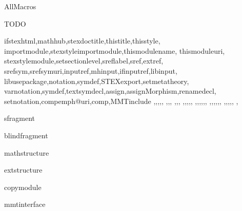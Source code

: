 \documentclass{stex}
\begin{document}
  \begin{smodule}{AllMacros}

  \begin{sfragment}{TODO}

    \begin{sfunction}{
      ifstexhtml,mathhub,stexdoctitle,thistitle,thisstyle,
      importmodule,stexstyleimportmodule,thismodulename,
      thismoduleuri,
      stexstylemodule,setsectionlevel,sreflabel,sref,extref,
      srefsym,srefsymuri,inputref,mhinput,ifinputref,libinput,
      libusepackage,notation,symdef,STEXexport,setmetatheory,
      varnotation,symdef,textsymdecl,assign,assignMorphism,renamedecl,
      setnotation,compemph@uri,comp,MMTinclude
    }{\ifstexhtml,\mathhub,\stexdoctitle,\thistitle,\thisstyle,
    \importmodule,\stexstyleimportmodule,\thismodulename,
    \thismoduleuri,\symdef,\textsymdecl,
    \stexstylemodule,\setsectionlevel,\sreflabel,\sref,\extref,
    \srefsym,\srefsymuri,,\mhinput,\ifinputref,\libinput,
    \libusepackage,\notation,\varnotation,\symdef,\STEXexport,\setmetatheory,
    \assign,\assignMorphism,\renamedecl,\setnotation,\compemph@uri,
    \comp,\MMTinclude
    }
    \end{sfunction}

    \begin{senv}{sfragment}\end{senv}
    \begin{senv}{blindfragment}\end{senv}
    \begin{senv}{mathstructure}\end{senv}
    \begin{senv}{extstructure}\end{senv}
    \begin{senv}{copymodule}\end{senv}
    \begin{senv}{mmtinterface}\end{senv}

  \end{sfragment}
  \end{smodule}
\end{document}
